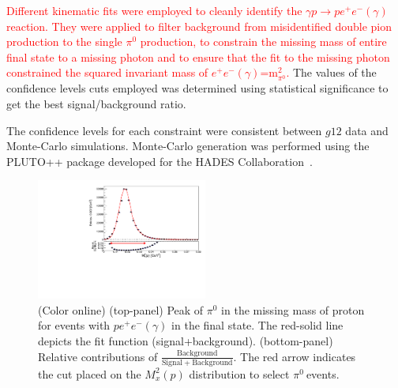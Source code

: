\documentclass[aps,prc,twocolumn,floatfix,showpacs,preprintnumbers,amsmath,amssymb,superscriptaddress,linenumbers]{revtex4-1}
\def\pizT{$\pi^{0} \ $}
\begin{document}
\textcolor{red}{Different kinematic fits were employed to cleanly identify the 
$\gamma p\rightarrow pe^+e^-(\gamma)$ reaction. They were applied 
to filter background from misidentified double pion production to 
the single $\pi^0$ production, to constrain the missing mass of entire 
final state to a missing photon and to ensure that the fit to the missing 
photon constrained the squared invariant 
mass of $e^+e^-(\gamma)$=m$^2_{\pi^0}$.} The values of the confidence levels cuts employed was 
determined using statistical significance to get the best signal/background ratio.

 The confidence levels for each constraint were consistent 
between $g12$ data and Monte-Carlo simulations. 
Monte-Carlo generation was performed using the PLUTO++ package 
developed for the HADES Collaboration~\cite{PLUTO}.
\begin{figure}[htb!]
\centerline{
        \includegraphics[height=0.35\textwidth,width=0.5\textwidth]{G12_Pi0_wBck.pdf}}

        \caption {(Color online) (top-panel) Peak of $\pi^0$ in the missing
        mass of proton for events with $pe^+e^-(\gamma)$ in the final state.
        The red-solid line depicts the fit function (signal+background).
        (bottom-panel) Relative contributions of $\frac{\mathrm{Background}}
        {\mathrm{Signal + Background}}$. The red arrow indicates the cut
        placed on the $M_x^2(p)$ distribution to select \pizT events.}
        \label{fig:pi0_peak}
\end{figure}
\end{document}

